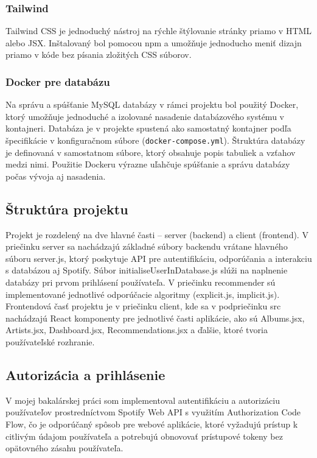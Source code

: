 \subsubsection{Tailwind}
Tailwind CSS je jednoduchý nástroj na rýchle štýlovanie stránky priamo v HTML alebo JSX. Inštalovaný bol pomocou npm a umožňuje jednoducho meniť dizajn priamo v kóde bez písania zložitých CSS súborov.

\subsubsection{Docker pre databázu}
Na správu a spúšťanie MySQL databázy v rámci projektu bol použitý Docker, ktorý umožňuje jednoduché a izolované nasadenie databázového systému v kontajneri. Databáza je v projekte spustená ako samostatný kontajner podľa špecifikácie v konfiguračnom súbore (\texttt{docker-compose.yml}). Štruktúra databázy je definovaná v samostatnom súbore, ktorý obsahuje popis tabuliek a vzťahov medzi nimi. Použitie Dockeru výrazne uľahčuje spúšťanie a správu databázy počas vývoja aj nasadenia.


\subsection{Štruktúra projektu}
Projekt je rozdelený na dve hlavné časti – server (backend) a client (frontend). V priečinku server sa nachádzajú základné súbory backendu vrátane hlavného súboru server.js, ktorý poskytuje API pre autentifikáciu, odporúčania a interakciu s databázou aj Spotify. Súbor initialiseUserInDatabase.js slúži na naplnenie databázy pri prvom prihlásení používateľa. V priečinku recommender sú implementované jednotlivé odporúčacie algoritmy (explicit.js, implicit.js). Frontendová časť projektu je v priečinku client, kde sa v podpriečinku src nachádzajú React komponenty pre jednotlivé časti aplikácie, ako sú Albums.jsx, Artists.jsx, Dashboard.jsx, Recommendations.jsx a ďalšie, ktoré tvoria používateľské rozhranie. 

\subsection{Autorizácia a prihlásenie}
V mojej bakalárskej práci som implementoval autentifikáciu a autorizáciu používateľov prostredníctvom Spotify Web API s využitím Authorization Code Flow, čo je odporúčaný spôsob pre webové aplikácie, ktoré vyžadujú prístup k citlivým údajom používateľa a potrebujú obnovovať prístupové tokeny bez opätovného zásahu používateľa.

